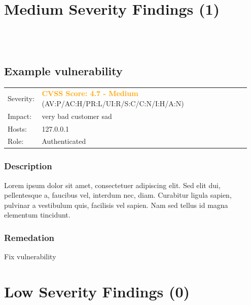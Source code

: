 \documentclass{article}
\begin{document}
\section{Medium Severity Findings (1)}
\\\\
\subsection{Example vulnerability}
\begin{table}[h]
    \centering
    \begin{tabular}{|p{0.1\linewidth} | p{0.85\linewidth}|} \rowcolor{orange}
        \hline & \\
        \hline Severity: & \textcolor{orange}{\textbf{CVSS Score: 4.7 - Medium}} (AV:P/AC:H/PR:L/UI:R/S:C/C:N/I:H/A:N)\\
        \hline Impact: & very bad customer sad  \\
        \hline Hosts: & 127.0.0.1 \\
        \hline Role: &Authenticated \\
        \hline
    \end{tabular}
\end{table}
\vspace{-7mm}

\subsubsection*{Description}
Lorem ipsum dolor sit amet, consectetuer adipiscing elit. Sed elit dui, pellentesque a, faucibus vel, interdum nec, diam. Curabitur ligula sapien, pulvinar a vestibulum quis, facilisis vel sapien. Nam sed tellus id magna elementum tincidunt.  



\subsubsection*{Remedation}
Fix vulnerability   

\newpage
\section{Low Severity Findings (0)}
\end{document}
